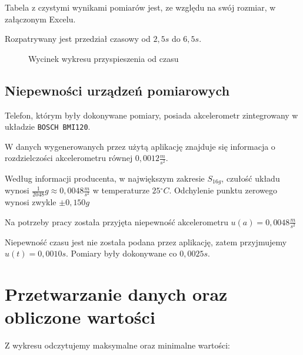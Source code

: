 \documentclass[a4paper,12pt]{article}
\newcommand{\stopnie}{\ensuremath{^{\circ}}}
\begin{document}
Tabela z czystymi wynikami pomiarów jest, ze względu na swój rozmiar, w załączonym Excelu.

Rozpatrywany jest przedział czasowy od $2,5s$ do $6,5s$.

\begin{figure}[h]
	\centering
	\caption{Wycinek wykresu przyspieszenia od czasu}
\end{figure}

\subsection{Niepewności urządzeń pomiarowych}

Telefon, którym były dokonywane pomiary, posiada akcelerometr zintegrowany w układzie \texttt{BOSCH BMI120}.

W danych wygenerowanych przez użytą aplikację znajduje się informacja o rozdzielczości akcelerometru równej $0,0012 \frac{m}{s^2}$.

Według informacji producenta, w największym zakresie $S_{16g}$, czułość układu wynosi $\frac{1}{2048}g \approx 0,0048 \frac{m}{s^2}$ w temperaturze $25\stopnie C$. Odchylenie punktu zerowego wynosi zwykle $\pm 0,150g$ 

Na potrzeby pracy została przyjęta niepewność akcelerometru $u\left(a\right) = 0,0048 \frac{m}{s^2}$

\vspace{1cm}

Niepewność czasu jest nie została podana przez aplikację, zatem przyjmujemy $u\left(t\right) = 0,0010 s$. Pomiary były dokonywane co $0,0025s$.

\section{Przetwarzanie danych oraz obliczone wartości}

Z wykresu odczytujemy maksymalne oraz minimalne wartości:
\end{document}

